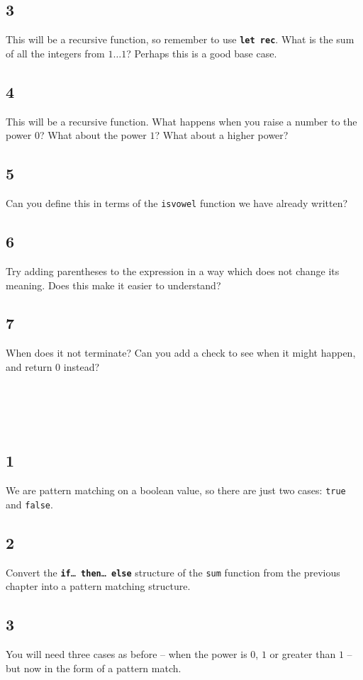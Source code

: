\documentclass[]{book}
\newcommand{\pif}{\textbf{if}\xspace}
\newcommand{\pthen}{\textbf{then}\xspace}
\newcommand{\pelse}{\textbf{else}\xspace}
\begin{document}
\begin{multicols*}{2}
\subsection*{3}
This will be a recursive function, so remember to use \texttt{\textbf{let\! rec}}. What is the sum of all the integers from $1\ldots 1$? Perhaps this is a good base case. 
\subsection*{4}
This will be a recursive function. What happens when you raise a number to the power $0$? What about the power $1$? What about a higher power?
\subsection*{5}
Can you define this in terms of the \texttt{isvowel} function we have already written?
\subsection*{6}
Try adding parentheses to the expression in a way which does not change its meaning. Does this make it easier to understand?
\subsection*{7}
When does it not terminate? Can you add a check to see when it might happen, and return $0$ instead?
\section*{\\ }
\subsection*{1}
We are pattern matching on a boolean value, so there are just two cases: \texttt{true} and \texttt{false}.
\subsection*{2}
Convert the \texttt{\pif\ldots\ \pthen\ldots\ \pelse} structure of the \texttt{sum} function from the previous chapter into a pattern matching structure.
\subsection*{3}
You will need three cases as before -- when the power is $0$, $1$ or greater than $1$ -- but now in the form of a pattern match.

\end{multicols*}
\end{document}

